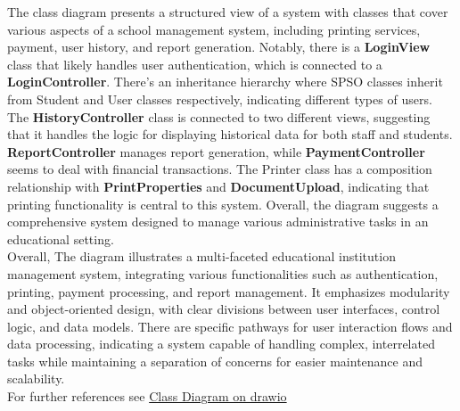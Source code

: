 The class diagram presents a structured view of a system with classes that cover various aspects of a school management system, including printing services, payment, user history, and report generation. Notably, there is a \textbf{LoginView} class that likely handles user authentication, which is connected to a \textbf{LoginController}. There's an inheritance hierarchy where SPSO classes inherit from Student and User classes respectively, indicating different types of users. The \textbf{HistoryController} class is connected to two different views, suggesting that it handles the logic for displaying historical data for both staff and students. \textbf{ReportController} manages report generation, while \textbf{PaymentController} seems to deal with financial transactions. The Printer class has a composition relationship with \textbf{PrintProperties} and \textbf{DocumentUpload}, indicating that printing functionality is central to this system. Overall, the diagram suggests a comprehensive system designed to manage various administrative tasks in an educational setting.\\

Overall, The diagram illustrates a multi-faceted educational institution management system, integrating various functionalities such as authentication, printing, payment processing, and report management. It emphasizes modularity and object-oriented design, with clear divisions between user interfaces, control logic, and data models. There are specific pathways for user interaction flows and data processing, indicating a system capable of handling complex, interrelated tasks while maintaining a separation of concerns for easier maintenance and scalability.\\

For further references see \href{https://drive.google.com/file/d/15Wbk8DiISW-IV2xAhueTpo-qr4kJO3H4/view?usp=sharing}{Class Diagram on drawio}